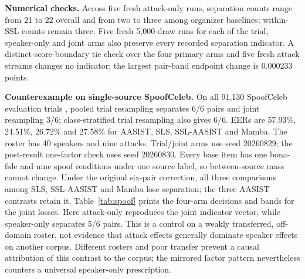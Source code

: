 \documentclass{article}
\begin{document}
\textbf{Numerical checks.} Across five fresh attack-only runs, separation counts range from 21 to 22 overall and from two to three among organizer baselines; within-SSL counts remain three. Five fresh 5,000-draw runs for each of the trial, speaker-only and joint arms also preserve every recorded separation indicator. A distinct-score-boundary tie check over the four primary arms and five fresh attack streams changes no indicator; the largest pair-band endpoint change is 0.000233 points.

\textbf{Counterexample on single-source SpoofCeleb.} On all 91,130 SpoofCeleb evaluation trials \cite{jung25spoofceleb}, pooled trial resampling separates 6/6 pairs and joint resampling 3/6; class-stratified trial resampling also gives 6/6. EERs are 57.93\%, 24.51\%, 26.72\% and 27.58\% for AASIST, SLS, SSL-AASIST and Mamba. The roster has 40 speakers and nine attacks. Trial/joint arms use seed 20260829; the post-result one-factor check uses seed 20260830. Every base item has one bona-fide and nine spoof renditions under one source label, so between-source mass cannot change. Under the original six-pair correction, all three comparisons among SLS, SSL-AASIST and Mamba lose separation; the three AASIST contrasts retain it. Table~\ref{tab:spoof} prints the four-arm decisions and bands for the joint losses. Here attack-only reproduces the joint indicator vector, while speaker-only separates 5/6 pairs. This is a control on a weakly transferred, off-domain roster, not evidence that attack effects generally dominate speaker effects on another corpus. Different rosters and poor transfer prevent a causal attribution of this contrast to the corpus; the mirrored factor pattern nevertheless counters a universal speaker-only prescription.
\end{document}

